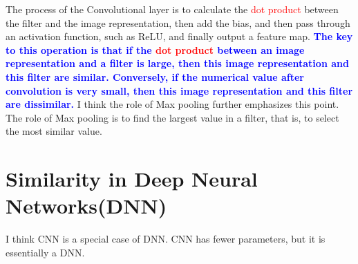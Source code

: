 \documentclass[oneside]{book}
\begin{document}
The process of the Convolutional layer is to calculate the \textcolor{red}{dot product} between the filter and the image representation, then add the bias, and then pass through an activation function, such as ReLU, and finally output a feature map. 
\textbf{\textcolor{blue}{The key to this operation is that if the \textcolor{red}{dot product} between an image representation and a filter is large, then this image representation and this filter are similar. Conversely, if the numerical value after convolution is very small, then this image representation and this filter are dissimilar.}} 
I think the role of Max pooling further emphasizes this point. The role of Max pooling is to find the largest value in a filter, that is, to select the most similar value.

\section{Similarity in Deep Neural Networks(DNN)}
I think CNN is a special case of DNN.
CNN has fewer parameters, but it is essentially a DNN.
\end{document}
